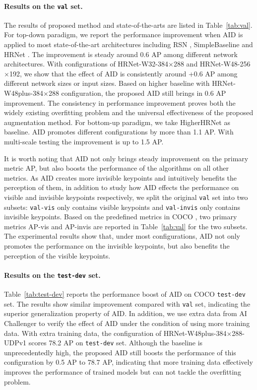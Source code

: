 \documentclass[final]{cvpr}
\begin{document}
\paragraph{Results on the \texttt{val} set.}
The results of proposed method and state-of-the-arts are listed in Table~\ref{tab:val}. For top-down paradigm, we report the performance improvement when AID is applied to most state-of-the-art architectures including RSN \cite{RSN}, SimpleBaseline \cite{SBNet} and HRNet \cite{HRNet}. The improvement is steady around 0.6 AP among different network architectures. With configurations of HRNet-W32-384$\times$288 and HRNet-W48-256$\times$192, we show that the effect of AID is consistently around +0.6 AP among different network sizes or input sizes. Based on higher baseline with HRNet-W48plus-384$\times$288 configuration, the proposed AID still brings in 0.6 AP improvement. The consistency in performance improvement proves both the widely existing overfitting problem and the universal effectiveness of the proposed augmentation method. For bottom-up paradigm, we take HigherHRNet \cite{Higher} as baseline. AID promotes different configurations by more than 1.1 AP. With multi-scale testing the improvement is up to 1.5 AP.

It is worth noting that AID not only brings steady improvement on the primary metric AP, but also boosts the performance of the algorithms on all other metrics. As AID creates more invisible keypoints and intuitively benefits the perception of them, in addition to study how AID effects the performance on visible and invisible keypoints respectively, we split the original \texttt{val} set into two subsets: \texttt{val-vis} only contains visible keypoints and \texttt{val-invis} only contains invisible keypoints. Based on the predefined metrics in COCO \cite{COCO}, two primary metrics AP-vis and AP-invis are reported in Table~\ref{tab:val} for the two subsets. The experimental results show that, under most configurations, AID not only promotes the performance on the invisible keypoints, but also benefits the perception of the visible keypoints.



\paragraph{Results on the \texttt{test-dev} set.} Table~\ref{tab:test-dev} reports the performance boost of AID on COCO \texttt{test-dev} set. The results show similar improvement compared with \texttt{val} set, indicating the superior generalization property of AID. In addition, we use extra data from AI Challenger \cite{AIchallenger} to verify the effect of AID under the condition of using more training data. With extra training data, the configuration of HRNet-W48plus-384$\times$288-UDPv1 scores 78.2 AP on \texttt{test-dev} set. Although the baseline is unprecedentedly high, the proposed AID still boosts the performance of this configuration by 0.5 AP to 78.7 AP, indicating that more training data effectively improves the performance of trained models but can not tackle the overfitting problem.
\end{document}
